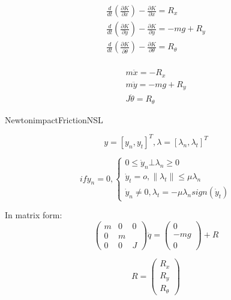 \documentclass[12 pt]{article}
\begin{document}
\begin{eqnarray}
&\frac{d}{dt}(\frac{\partial K}{\partial \dot{x}})-\frac{\partial K}{\partial x}=R_x& \label{k2} \\
&\frac{d}{dt}(\frac{\partial K}{\partial \dot{y}})-\frac{\partial K}{\partial y}=-mg+R_y& \label{k3} \\
&\frac{d}{dt}(\frac{\partial K}{\partial \dot{\theta}})-\frac{\partial K}{\partial \theta}=R_{\theta}\label{k2} \\
\end{eqnarray}

\begin{eqnarray}
&m\ddot{x}=-R_x&\\
&m\ddot{y}=-mg+R_y&\\
&J\ddot{\theta}=R_{\theta}&
\end{eqnarray}

NewtonimpactFrictionNSL

\begin{equation}
y=[y_n,y_t]^T,\lambda=[\lambda_n,\lambda_t]^T
\end{equation}

\begin{equation}
if y_n=0, \left\{ \begin{matrix} 
0\le \dot{y}_n \bot \lambda_n \ge 0 \\
\dot{y}_t=o,\|\lambda_t \| \le \mu \lambda_n\\
\dot{y}_n \neq0, \lambda_t=-\mu \lambda_n sign(\dot{y}_t)
\end{matrix} \right.
\end{equation}

In matrix form:
\begin{equation}
\begin{pmatrix} m & 0 & 0 \\
0 & m & \\
0 & 0 & J \end{pmatrix}
\ddot{q}= \begin{pmatrix}
0 \\ -mg \\ 0 
\end{pmatrix}+R
\end{equation}

\begin{equation}
R=\begin{pmatrix}
R_x \\ R_y \\ R_{\theta}
\end{pmatrix}
\end{equation}
\end{document}
